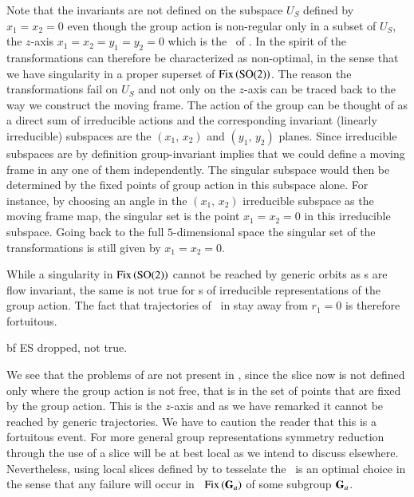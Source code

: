 Note that the invariants are not defined on
the subspace $U_S$ defined by $x_1=x_2=0$ even though the
group action is non-regular only in a subset of $U_S$, the
$z$-axis $x_1=x_2=y_1=y_2=0$ which is the \fixedsp\ of .
In the spirit of  the transformations 
can therefore be characterized as non-optimal, in the sense
that we have singularity in a proper superset of $\mathrm{Fix}\left(\textrm{SO}(2)\right)$.
The reason the transformations fail on $U_S$ and not only on the $z$-axis
can be traced back to the way we construct the moving frame. The action
of the group can be thought of as a direct sum of irreducible
actions and the corresponding invariant (linearly irreducible)
subspaces are the $(x_1,\,x_2)$ and $(y_1,\,y_2)$
planes.
Since irreducible subspaces are by definition group-invariant
implies that we could define a moving frame in any one of them
independently. The singular subspace would then be determined
by the fixed points of group action in this subspace alone.
For instance, by choosing an angle in the $(x_1,\,x_2)$ irreducible subspace
as the moving frame map, the singular set is the point
$x_1=x_2=0$ in this irreducible subspace. Going back to the full
$5$-dimensional space the singular set of the transformations
is still given by $x_1=x_2=0$.

While a singularity in $\mathrm{Fix}\left(\textrm{SO}(2)\right)$ cannot be reached by generic orbits
as {\fixedsp s} are flow invariant, the same is not true for {\fixedsp s}
of irreducible representations of the group action.
The fact that trajectories of \cLf\ in  stay away from $r_1=0$ is therefore
fortuitous.

{bf ES dropped, not true.}

We see that the problems of
 are not present in , since
the slice now is not defined only where the group action is not free,
that is in the set of points that are fixed by the group action. This
is the $z$-axis and as we have remarked it cannot be reached by generic
trajectories. We have to caution the reader that this is a fortuitous
event. For more general group representations symmetry reduction through
the use of a slice will be at best local as we intend to discuss
elsewhere. Nevertheless, using local slices defined by 
to tesselate the \reducedsp\ is an optimal choice in the sense that any
failure will occur in \fixedsp\ $\mathrm{Fix}\left(\mathbf{G}_a\right)$ of some subgroup
$\mathbf{G}_a$.




